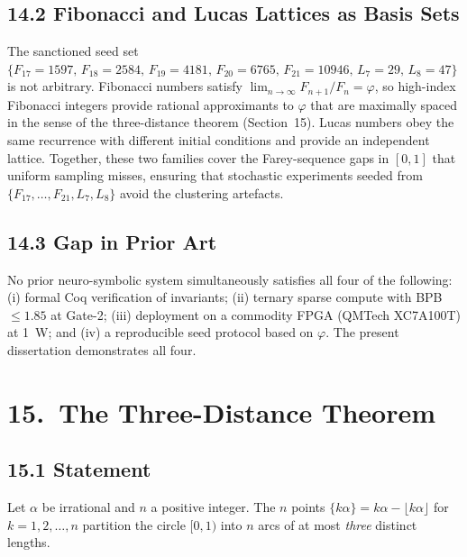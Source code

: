\subsection{14.2 Fibonacci and Lucas Lattices as Basis Sets}
\label{subsec:gc-basis}

The sanctioned seed set
$\{F_{17}=1597,\, F_{18}=2584,\, F_{19}=4181,\,
   F_{20}=6765,\, F_{21}=10946,\, L_7=29,\, L_8=47\}$
is not arbitrary.
Fibonacci numbers satisfy
$\lim_{n\to\infty} F_{n+1}/F_n = \varphi$,
so high-index Fibonacci integers provide rational
approximants to $\varphi$ that are maximally spaced
in the sense of the three-distance theorem
(Section~15).
Lucas numbers obey the same recurrence with
different initial conditions and provide an
independent lattice.
Together, these two families cover the Farey-sequence
gaps in $[0,1]$ that uniform sampling misses, ensuring
that stochastic experiments seeded from
$\{F_{17},\ldots,F_{21},L_7,L_8\}$ avoid the
clustering artefacts.

\subsection{14.3 Gap in Prior Art}
\label{subsec:gc-gap}

No prior neuro-symbolic system simultaneously
satisfies all four of the following:
(i) formal Coq verification of invariants;
(ii) ternary sparse compute with BPB $\leq 1.85$ at Gate-2;
(iii) deployment on a commodity FPGA (QMTech XC7A100T) at 1~W;
and (iv) a reproducible seed protocol based on $\varphi$.
The present dissertation demonstrates all four.

\section{15.\ The Three-Distance Theorem}
\label{sec:gc-three-distance}

\subsection{15.1 Statement}
\label{subsec:gc-3d-stmt}

\begin{theorem}
\label{thm:gc-three-distance}
Let $\alpha$ be irrational and $n$ a positive integer.
The $n$ points $\{k\alpha\} = k\alpha - \lfloor k\alpha \rfloor$
for $k = 1, 2, \ldots, n$ partition the circle
$[0,1)$ into $n$ arcs of at most \emph{three}
distinct lengths.
\end{theorem}

